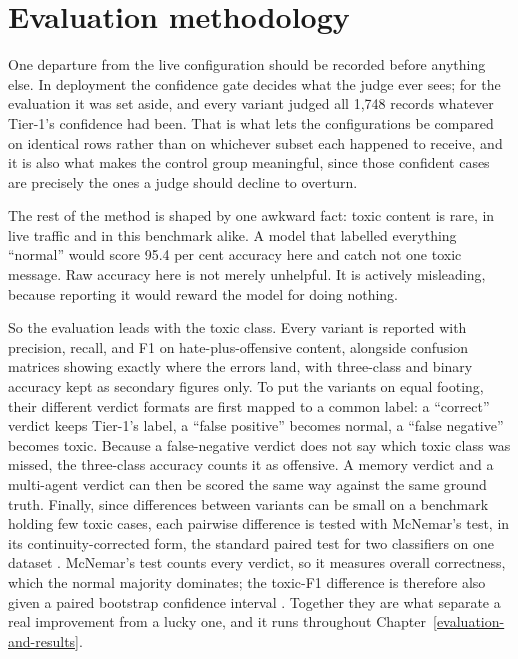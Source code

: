 \section{Evaluation methodology}\label{evaluation-methodology}

One departure from the live configuration should be recorded before anything else. In deployment the confidence gate decides what the judge ever sees; for the evaluation it was set aside, and every variant judged all 1,748 records whatever Tier-1's confidence had been. That is what lets the configurations be compared on identical rows rather than on whichever subset each happened to receive, and it is also what makes the control group meaningful, since those confident cases are precisely the ones a judge should decline to overturn.

The rest of the method is shaped by one awkward fact: toxic content is rare, in live traffic and in this benchmark alike. A model that labelled everything ``normal'' would score 95.4 per cent accuracy here and catch not one toxic message. Raw accuracy here is not merely unhelpful. It is actively misleading, because reporting it would reward the model for doing nothing.

So the evaluation leads with the toxic class. Every variant is reported with precision, recall, and F1 on hate-plus-offensive content, alongside confusion matrices showing exactly where the errors land, with three-class and binary accuracy kept as secondary figures only. To put the variants on equal footing, their different verdict formats are first mapped to a common label: a ``correct'' verdict keeps Tier-1's label, a ``false positive'' becomes normal, a ``false negative'' becomes toxic. Because a false-negative verdict does not say which toxic class was missed, the three-class accuracy counts it as offensive. A memory verdict and a multi-agent verdict can then be scored the same way against the same ground truth. Finally, since differences between variants can be small on a benchmark holding few toxic cases, each pairwise difference is tested with McNemar's test, in its continuity-corrected form, the standard paired test for two classifiers on one dataset \citep{mcnemar1947, dietterich1998}. McNemar's test counts every verdict, so it measures overall correctness, which the normal majority dominates; the toxic-F1 difference is therefore also given a paired bootstrap confidence interval \citep{efron1993}. Together they are what separate a real improvement from a lucky one, and it runs throughout Chapter~\ref{evaluation-and-results}.

